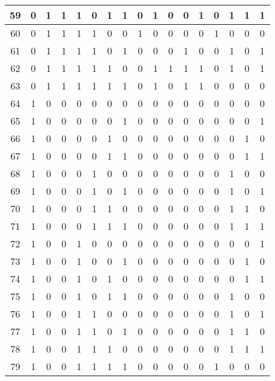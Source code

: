 \documentclass[12pt, oneside, openany]{article}
\begin{document}
{\begin{longtable}[c]{|c||c|c|c|c|c|c|c||c|c|c|c|c|c|c|c|c|}
    \hline
    59 & 0 &  1 & 1 & 1 & 0 & 1 & 1 &  0 & 1 & 0 & 0 &  1 &  0 & 1 & 1 & 1 \\
    \hline
    60 & 0 &  1 & 1 & 1 & 1 & 0 & 0 &  1 & 0 & 0 & 0 &  0 &  1 & 0 & 0 & 0 \\
    \hline
    61 & 0 &  1 & 1 & 1 & 1 & 0 & 1 &  0 & 0 & 0 & 1 &  0 &  0 & 1 & 0 & 1 \\
    \hline
    62 & 0 &  1 & 1 & 1 & 1 & 1 & 0 &  0 & 1 & 1 & 1 &  1 &  0 & 1 & 0 & 1 \\
    \hline
    63 & 0 &  1 & 1 & 1 & 1 & 1 & 1 &  0 & 1 & 0 & 1 &  1 &  0 & 0 & 0 & 0 \\
    \hline
    64 & 1 &  0 & 0 & 0 & 0 & 0 & 0 &  0 & 0 & 0 & 0 &  0 &  0 & 0 & 0 & 0 \\
    \hline
    65 & 1 &  0 & 0 & 0 & 0 & 0 & 1 &  0 & 0 & 0 & 0 &  0 &  0 & 0 & 0 & 1 \\
    \hline
    66 & 1 &  0 & 0 & 0 & 0 & 1 & 0 &  0 & 0 & 0 & 0 &  0 &  0 & 0 & 1 & 0 \\
    \hline
    67 & 1 &  0 & 0 & 0 & 0 & 1 & 1 &  0 & 0 & 0 & 0 &  0 &  0 & 0 & 1 & 1 \\
    \hline
    68 & 1 &  0 & 0 & 0 & 1 & 0 & 0 &  0 & 0 & 0 & 0 &  0 &  0 & 1 & 0 & 0 \\
    \hline
    69 & 1 &  0 & 0 & 0 & 1 & 0 & 1 &  0 & 0 & 0 & 0 &  0 &  0 & 1 & 0 & 1 \\
    \hline
    70 & 1 &  0 & 0 & 0 & 1 & 1 & 0 &  0 & 0 & 0 & 0 &  0 &  0 & 1 & 1 & 0 \\
    \hline
    71 & 1 &  0 & 0 & 0 & 1 & 1 & 1 &  0 & 0 & 0 & 0 &  0 &  0 & 1 & 1 & 1 \\
    \hline
    72 & 1 &  0 & 0 & 1 & 0 & 0 & 0 &  0 & 0 & 0 & 0 &  0 &  0 & 0 & 0 & 1 \\
    \hline
    73 & 1 &  0 & 0 & 1 & 0 & 0 & 1 &  0 & 0 & 0 & 0 &  0 &  0 & 0 & 1 & 0 \\
    \hline
    74 & 1 &  0 & 0 & 1 & 0 & 1 & 0 &  0 & 0 & 0 & 0 &  0 &  0 & 0 & 1 & 1 \\
    \hline
    75 & 1 &  0 & 0 & 1 & 0 & 1 & 1 &  0 & 0 & 0 & 0 &  0 &  0 & 1 & 0 & 0 \\
    \hline
    76 & 1 &  0 & 0 & 1 & 1 & 0 & 0 &  0 & 0 & 0 & 0 &  0 &  0 & 1 & 0 & 1 \\
    \hline
    77 & 1 &  0 & 0 & 1 & 1 & 0 & 1 &  0 & 0 & 0 & 0 &  0 &  0 & 1 & 1 & 0 \\
    \hline
    78 & 1 &  0 & 0 & 1 & 1 & 1 & 0 &  0 & 0 & 0 & 0 &  0 &  0 & 1 & 1 & 1 \\
    \hline
    79 & 1 &  0 & 0 & 1 & 1 & 1 & 1 &  0 & 0 & 0 & 0 &  0 &  1 & 0 & 0 & 0 \\

\end{longtable}}
\end{document}
